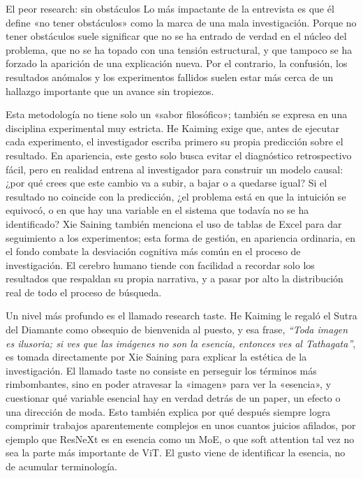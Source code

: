 \documentclass[a4paper,12pt]{article}
\begin{document}
\begin{warningbox}{El peor research: sin obstáculos}
Lo más impactante de la entrevista es que él define «no tener obstáculos» como la marca de una mala investigación. Porque no tener obstáculos suele significar que no se ha entrado de verdad en el núcleo del problema, que no se ha topado con una tensión estructural, y que tampoco se ha forzado la aparición de una explicación nueva. Por el contrario, la confusión, los resultados anómalos y los experimentos fallidos suelen estar más cerca de un hallazgo importante que un avance sin tropiezos.
\end{warningbox}

Esta metodología no tiene solo un «sabor filosófico»; también se expresa en una disciplina experimental muy estricta. He Kaiming exige que, antes de ejecutar cada experimento, el investigador escriba primero su propia predicción sobre el resultado. En apariencia, este gesto solo busca evitar el diagnóstico retrospectivo fácil, pero en realidad entrena al investigador para construir un modelo causal: ¿por qué crees que este cambio va a subir, a bajar o a quedarse igual? Si el resultado no coincide con la predicción, ¿el problema está en que la intuición se equivocó, o en que hay una variable en el sistema que todavía no se ha identificado? Xie Saining también menciona el uso de tablas de Excel para dar seguimiento a los experimentos; esta forma de gestión, en apariencia ordinaria, en el fondo combate la desviación cognitiva más común en el proceso de investigación. El cerebro humano tiende con facilidad a recordar solo los resultados que respaldan su propia narrativa, y a pasar por alto la distribución real de todo el proceso de búsqueda.

Un nivel más profundo es el llamado research taste. He Kaiming le regaló el Sutra del Diamante como obsequio de bienvenida al puesto, y esa frase, \textit{``Toda imagen es ilusoria; si ves que las imágenes no son la esencia, entonces ves al Tathagata''}, es tomada directamente por Xie Saining para explicar la estética de la investigación. El llamado taste no consiste en perseguir los términos más rimbombantes, sino en poder atravesar la «imagen» para ver la «esencia», y cuestionar qué variable esencial hay en verdad detrás de un paper, un efecto o una dirección de moda. Esto también explica por qué después siempre logra comprimir trabajos aparentemente complejos en unos cuantos juicios afilados, por ejemplo que ResNeXt es en esencia como un MoE, o que soft attention tal vez no sea la parte más importante de ViT. El gusto viene de identificar la esencia, no de acumular terminología.
\end{document}
